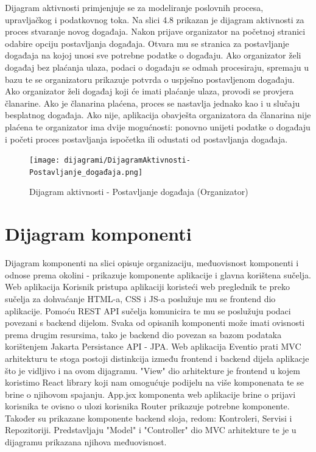 			Dijagram aktivnosti primjenjuje se za modeliranje poslovnih procesa, upravljačkog i podatkovnog toka. Na slici 4.8 prikazan je dijagram aktivnosti za proces stvaranje novog događaja. Nakon prijave organizator na početnoj stranici odabire opciju postavljanja događaja. Otvara mu se stranica za postavljanje događaja na kojoj unosi sve potrebne podatke o događaju. Ako organizator želi događaj bez plaćanja ulaza, podaci o događaju se odmah procesiraju, spremaju u bazu te se organizatoru prikazuje potvrda o uspješno postavljenom događaju. Ako organizator želi događaj koji će imati plaćanje ulaza, provodi se provjera članarine. Ako je članarina plaćena, proces se nastavlja jednako kao i u slučaju besplatnog događaja. Ako nije, aplikacija obavješta organizatora da članarina nije plaćena te organizator ima dvije mogućnosti: ponovno unijeti podatke o događaju i početi proces postavljanja ispočetka ili odustati od postavljanja događaja.
			
			\begin{figure}[H]
				\texttt{[image: dijagrami/DijagramAktivnosti-Postavljanje\_događaja.png]}
				\centering
				\caption{Dijagram aktivnosti - Postavljanje događaja (Organizator)}
				\label{fig:promjene}
			\end{figure}
			
			\eject
		\section{Dijagram komponenti}
		
		Dijagram komponenti na slici opisuje organizaciju, međuovisnost komponenti i odnose prema okolini - prikazuje komponente aplikacije i glavna korištena sučelja. Web aplikacija Korisnik pristupa aplikaciji koristeći web preglednik te preko sučelja za dohvaćanje HTML-a, CSS i JS-a poslužuje mu se frontend dio aplikacije. Pomoću REST API sučelja komunicira te mu se poslužuju podaci povezani s backend dijelom. Svaka od opisanih komponenti može imati ovisnosti prema drugim resursima, tako je backend dio povezan sa bazom podataka korištenjem Jakarta Persistance API - JPA. 
		Web aplikacija Eventio prati MVC arhitekturu te stoga postoji distinkcija između frontend i backend dijela aplikacje što je vidljivo i na ovom dijagramu. "View" dio arhitekture je frontend u kojem koristimo React library koji nam omogućuje podijelu na više komponenata te se brine o njihovom spajanju. App.jsx komponenta web aplikacije brine o prijavi korisnika te ovisno o ulozi korisnika Router prikazuje potrebne komponente. Također su prikazane komponente backend sloja, redom: Kontroleri, Servisi i Repozitoriji. Predstavljaju "Model" i "Controller" dio MVC arhitekture te je u dijagramu prikazana njihova međuovisnost.
				

